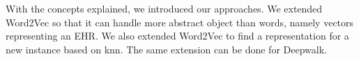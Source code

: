 With the concepts explained, we introduced our approaches. We extended Word2Vec so that it can handle more abstract object than words, namely vectors representing an EHR. We also extended Word2Vec to find a representation for a new instance based on knn. The same extension can be done for Deepwalk.



